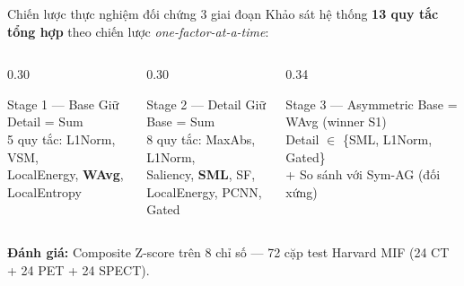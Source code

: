 \documentclass[t, aspectratio=169]{beamer}
\begin{document}
\begin{frame}{Chiến lược thực nghiệm đối chứng 3 giai đoạn}
    Khảo sát hệ thống \textbf{13 quy tắc tổng hợp} theo chiến lược \emph{one-factor-at-a-time}:
    \vspace{0.3em}
    \begin{columns}[T]
        \begin{column}{0.30\textwidth}
            \begin{block}{\small Stage 1 --- Base}
                \small Giữ Detail = Sum\\[3pt]
                5 quy tắc: L1Norm, VSM,\\
                LocalEnergy, \textbf{WAvg},\\
                LocalEntropy
            \end{block}
        \end{column}
        \begin{column}{0.30\textwidth}
            \begin{block}{\small Stage 2 --- Detail}
                \small Giữ Base = Sum\\[3pt]
                8 quy tắc: MaxAbs, L1Norm,\\
                Saliency, \textbf{SML}, SF,\\
                LocalEnergy, PCNN, Gated
            \end{block}
        \end{column}
        \begin{column}{0.34\textwidth}
            \begin{alertblock}{\small Stage 3 --- Asymmetric}
                \small Base = WAvg (winner S1)\\
                Detail $\in$ \{SML, L1Norm, Gated\}\\[3pt]
                + So sánh với Sym-AG (đối xứng)
            \end{alertblock}
        \end{column}
    \end{columns}
    \vspace{0.5em}
    \textbf{Đánh giá:} Composite Z-score trên 8 chỉ số --- 72 cặp test Harvard MIF (24 CT + 24 PET + 24 SPECT).
\end{frame}
\end{document}
